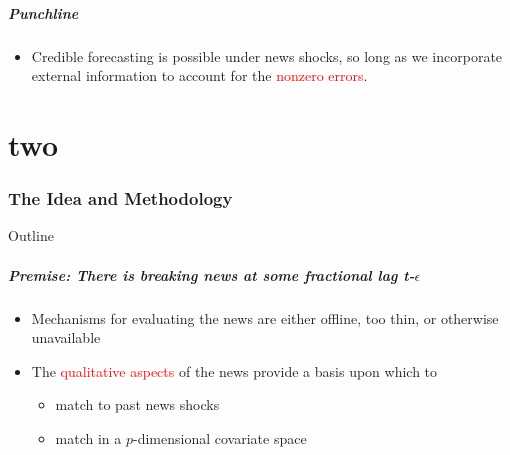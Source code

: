 \documentclass[9pt]{beamer}
\theoremstyle{definition}
\begin{document}
\begin{frame}
    \frametitle{Punchline}
    
    \begin{itemize}
        \item <1-> Credible forecasting is possible under news shocks, so long as we incorporate external information to account for the \textcolor{red}{nonzero errors}. 
    \end{itemize}



    \end{frame}

\part{two}

\section{The Idea and Methodology}

\begin{frame}{Outline} %
    \tableofcontents[part=1,currentsection]\tableofcontents
\end{frame}

\begin{frame}
    \frametitle{Premise: There is breaking news at some fractional lag t-$\epsilon$}
    
    \begin{itemize}
    \item Mechanisms for evaluating the news are either offline, too thin, or otherwise unavailable
    \item The \textcolor{red}{qualitative aspects} of the news provide a basis upon which to 
    \begin{itemize}
        \item match to past news shocks
        \item match in a $p$-dimensional covariate space
    \end{itemize}
    \end{itemize}
    \end{frame}


    
       
    
\end{document}
